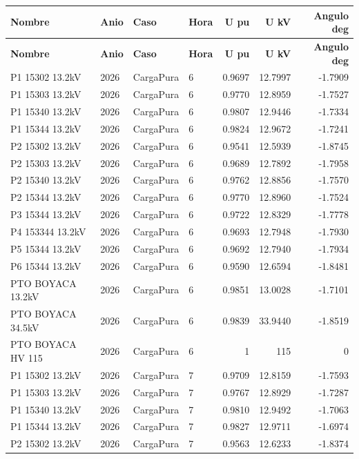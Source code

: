 \documentclass[11pt,a4paper]{article}
\begin{document}
\small
\begin{longtable}{llllrrr}
\toprule
\textbf{Nombre} & \textbf{Anio} & \textbf{Caso} & \textbf{Hora} & \textbf{U pu} & \textbf{U kV} & \textbf{Angulo deg} \\
\midrule
\endfirsthead
\toprule
\textbf{Nombre} & \textbf{Anio} & \textbf{Caso} & \textbf{Hora} & \textbf{U pu} & \textbf{U kV} & \textbf{Angulo deg} \\
\midrule
\endhead
\bottomrule
\endfoot
P1 15302 13.2kV & 2026 & CargaPura & 6 & 0.9697 & 12.7997 & -1.7909 \\
P1 15303 13.2kV & 2026 & CargaPura & 6 & 0.9770 & 12.8959 & -1.7527 \\
P1 15340 13.2kV & 2026 & CargaPura & 6 & 0.9807 & 12.9446 & -1.7334 \\
P1 15344 13.2kV & 2026 & CargaPura & 6 & 0.9824 & 12.9672 & -1.7241 \\
P2 15302 13.2kV & 2026 & CargaPura & 6 & 0.9541 & 12.5939 & -1.8745 \\
P2 15303 13.2kV & 2026 & CargaPura & 6 & 0.9689 & 12.7892 & -1.7958 \\
P2 15340 13.2kV & 2026 & CargaPura & 6 & 0.9762 & 12.8856 & -1.7570 \\
P2 15344 13.2kV & 2026 & CargaPura & 6 & 0.9770 & 12.8960 & -1.7524 \\
P3 15344 13.2kV & 2026 & CargaPura & 6 & 0.9722 & 12.8329 & -1.7778 \\
P4 153344 13.2kV & 2026 & CargaPura & 6 & 0.9693 & 12.7948 & -1.7930 \\
P5 15344 13.2kV & 2026 & CargaPura & 6 & 0.9692 & 12.7940 & -1.7934 \\
P6 15344 13.2kV & 2026 & CargaPura & 6 & 0.9590 & 12.6594 & -1.8481 \\
PTO BOYACA 13.2kV & 2026 & CargaPura & 6 & 0.9851 & 13.0028 & -1.7101 \\
PTO BOYACA 34.5kV & 2026 & CargaPura & 6 & 0.9839 & 33.9440 & -1.8519 \\
PTO BOYACA HV 115 & 2026 & CargaPura & 6 & 1 & 115 & 0 \\
P1 15302 13.2kV & 2026 & CargaPura & 7 & 0.9709 & 12.8159 & -1.7593 \\
P1 15303 13.2kV & 2026 & CargaPura & 7 & 0.9767 & 12.8929 & -1.7287 \\
P1 15340 13.2kV & 2026 & CargaPura & 7 & 0.9810 & 12.9492 & -1.7063 \\
P1 15344 13.2kV & 2026 & CargaPura & 7 & 0.9827 & 12.9711 & -1.6974 \\
P2 15302 13.2kV & 2026 & CargaPura & 7 & 0.9563 & 12.6233 & -1.8374 \\

\end{longtable}
\end{document}
